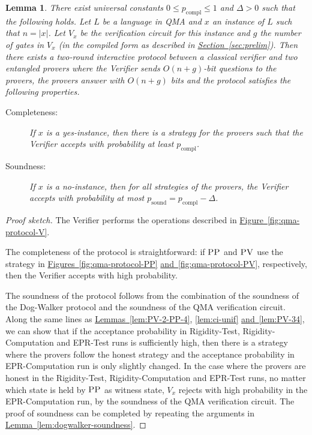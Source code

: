 \documentclass[11pt]{article}
\numberwithin{equation}{section}
\newtheorem{lemma}[theorem]{Lemma}
\theoremstyle{definition}
\theoremstyle{plain}
\newcommand{\expref}[2]{\hyperref[#2]{#1~\ref{#2}}}
\DeclareMathOperator{\sound}{sound}
\DeclareMathOperator{\compl}{compl}
\newcommand{\pv}{\textsc{PV}}
\newcommand{\pp}{\textsc{PP}}
\begin{document}
\begin{lemma}\label{lem:qma}
There %
exist  %
universal constants
%
$0\leq p_{\compl}\leq 1$   %
and $\Delta >0$ such that the following holds. 
Let $L$ be a language in QMA and $x$ an instance of $L$ such that $n = |x|$. Let  $V_x$ be the
  verification circuit for this instance and $g$ the number of gates in $V_x$
  (in the compiled form as described in \expref{Section}{sec:prelim}). Then there exists a two-round interactive protocol
between a classical verifier and two entangled provers where the Verifier
sends  $O(n + g)$-bit questions to the provers, the provers answer with $O(n + g)$ bits and the protocol satisfies the following properties.
\begin{description}
\item[Completeness:] If $x$ is a yes-instance, then  there is a strategy for the provers such that the Verifier accepts with probability  at least
%
$p_{\compl}$.
\item[Soundness:] If $x$ is a no-instance, then for all strategies of the provers, the Verifier accepts with  probability at most
%
$p_{\sound} = p_{\compl} - \Delta$.  %
\end{description}
\end{lemma}
\begin{proof}[Proof sketch]
The Verifier performs the operations described in \expref{Figure}{fig:qma-protocol-V}. 

  The completeness of the protocol is straightforward: if $\pp$ and $\pv$ use the strategy in \expref{Figures}{fig:qma-protocol-PP} \expref{and}{fig:qma-protocol-PV}, respectively, then the Verifier accepts with  high probability.

  The soundness of the protocol follows from the combination of the soundness of the
  Dog-Walker protocol and the soundness of the QMA verification circuit. Along the same lines as 
  \expref{Lemmas}{lem:PV-2-PP-4}, \ref{lem:ci-unif} \expref{and}{lem:PV-34},
  we can show that if
  the acceptance probability in Rigidity-Test, Rigidity-Computation and
  EPR-Test runs
  is sufficiently high, then there is a strategy where the provers follow the honest
  strategy and the acceptance probability in EPR-Computation run is only slightly
  changed.  
  In the case where the provers are honest in the Rigidity-Test, Rigidity-Computation and EPR-Test runs, no matter which state is held
  by $\pp$ as witness state, $V_x$ rejects with high probability in the EPR-Computation run, by the
  soundness of the QMA verification circuit.  The proof of soundness can be completed by repeating the
  arguments in \expref{Lemma}{lem:dogwalker-soundness}.
\end{proof}
\end{document}
